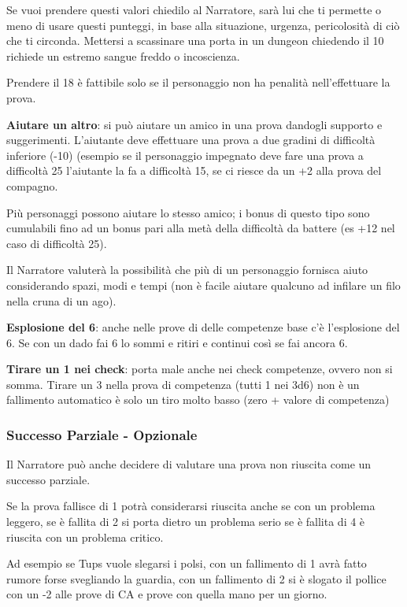 \documentclass[a4paper,11pt,twoside,openany]{book}
\begin{document}
Se vuoi prendere questi valori chiedilo al Narratore, sarà lui che ti permette o meno di usare questi punteggi, in base alla situazione, urgenza, pericolosità di ciò che ti circonda. Mettersi a scassinare una porta in un dungeon chiedendo il 10 richiede un estremo sangue freddo o incoscienza.


Prendere il 18 è fattibile solo se il personaggio non ha penalità nell'effettuare la prova.

\textbf{Aiutare un altro}: si può aiutare un amico in una prova dandogli supporto e suggerimenti. L'aiutante deve effettuare una prova a due gradini di difficoltà inferiore (-10) (esempio se il personaggio impegnato deve fare una prova a difficoltà 25 l'aiutante la fa a difficoltà 15, se ci riesce da un +2 alla prova del compagno.


Più personaggi possono aiutare lo stesso amico; i bonus di questo tipo sono cumulabili fino ad un bonus pari alla metà della difficoltà da battere (es +12 nel caso di difficoltà 25).

Il Narratore valuterà la possibilità che più di un personaggio fornisca aiuto considerando spazi, modi e tempi (non è facile aiutare qualcuno ad infilare un filo nella cruna di un ago).

\textbf{Esplosione del 6}: anche nelle prove di delle competenze base c'è l'esplosione del 6. Se con un dado fai 6 lo sommi e ritiri e continui così se fai ancora 6.

\textbf{Tirare un 1 nei check}: porta male anche nei check competenze, ovvero non si somma.
Tirare un 3 nella prova di competenza (tutti 1 nei 3d6) non è un fallimento automatico è solo un tiro molto basso (zero + valore di competenza)

\subsubsection{Successo Parziale - Opzionale}

Il Narratore può anche decidere di valutare una prova non riuscita come un successo parziale.

Se la prova fallisce di 1 potrà considerarsi riuscita anche se con un problema leggero, se è fallita di 2 si porta dietro un problema serio se è fallita di 4 è riuscita con un problema critico.

Ad esempio se Tups vuole slegarsi i polsi, con un fallimento di 1 avrà fatto rumore forse svegliando la guardia, con un fallimento di 2 si è slogato il pollice con un -2 alle prove di CA e prove con quella mano per un giorno.
\end{document}
